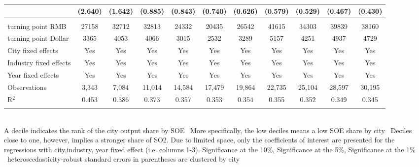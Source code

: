\documentclass[12pt]{article}
\begin{document}
\begin{table}[!htbp]
\begin{adjustbox}{width=\textwidth, totalheight=\baselineskip,keepaspectratio}
\begin{tabular}{@{\extracolsep{5pt}}lcccccccccc}
  & (2.640) & (1.642) & (0.885) & (0.843) & (0.740) & (0.626) & (0.579) & (0.529) & (0.467) & (0.430) \\ 
 \hline \\[-1.8ex] 
turning point RMB & 27158 & 32712 & 32813 & 24332 & 20435 & 26542 & 41615 & 34303 & 39839 & 38160 \\ 
turning point Dollar & 3365 & 4053 & 4066 & 3015 & 2532 & 3289 & 5157 & 4251 & 4937 & 4729 \\ 
City fixed effects & Yes & Yes & Yes & Yes & Yes & Yes & Yes & Yes & Yes & Yes \\ 
Industry fixed effects & Yes & Yes & Yes & Yes & Yes & Yes & Yes & Yes & Yes & Yes \\ 
Year fixed effects & Yes & Yes & Yes & Yes & Yes & Yes & Yes & Yes & Yes & Yes \\ 
Observations & 3,343 & 7,084 & 11,014 & 14,584 & 17,479 & 19,864 & 22,735 & 25,104 & 28,597 & 30,195 \\ 
R$^{2}$ & 0.453 & 0.386 & 0.373 & 0.357 & 0.353 & 0.354 & 0.355 & 0.352 & 0.349 & 0.345 \\ 
\hline 
\hline \\[-1.8ex] 
\end{tabular}
\end{adjustbox}
\begin{tablenotes} 
 \small 
 \item \\ 
\footnotesize{
A decile indicates the rank of the city output share by SOE \
More specifically, the low deciles means a low SOE share by city \
Deciles close to one, however, implies a stronger share of SO2.
Due to limited space, only the coefficients of interest are presented 
for the regressions with city,industry, year fixed effect (i.e. columns 1-3).
\sym{*} Significance at the 10\%, \sym{**} Significance at the 5\%, \sym{***} Significance at the 1\% \
heteroscedasticity-robust standard errors in parentheses are clustered by city 
}
 
\end{tablenotes}
\end{table}
\end{document}
